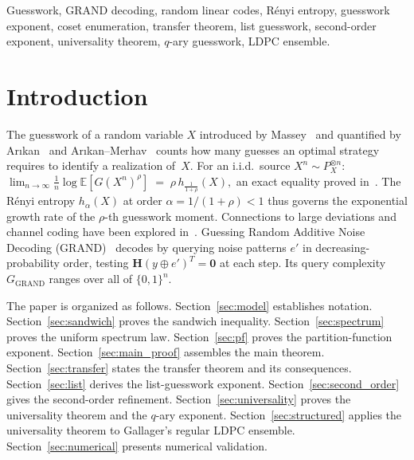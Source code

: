 \documentclass[journal,10pt,onecolumn]{IEEEtran}
\newcommand{\Eb}{\mathbb{E}}
\newcommand{\Hm}{\mathbf{H}}
\begin{document}
\begin{IEEEkeywords}
Guesswork, GRAND decoding, random linear codes,
R\'{e}nyi entropy, guesswork exponent, coset enumeration,
transfer theorem, list guesswork, second-order exponent,
universality theorem, $q$-ary guesswork, LDPC ensemble.
\end{IEEEkeywords}

\section{Introduction}
\label{sec:intro}

The guesswork of a random variable $X$ introduced by
Massey~\cite{massey1994guessing} and quantified by
Ar{\i}kan~\cite{arikan1996inequality} and
Ar{\i}kan--Merhav~\cite{arikan1998guessing}
counts how many guesses an optimal strategy requires to identify
a realization of~$X$.
For an i.i.d.\ source $X^n\sim P_X^{\otimes n}$:
\(
    \lim_{n\to\infty}\frac{1}{n}\log\Eb[G(X^n)^\rho]
    \;=\;
    \rho\,h_{\!\frac{1}{1+\rho}}(X),
\)
an exact equality proved in~\cite{arikan1996inequality}.
The R\'{e}nyi entropy $h_\alpha(X)$ at order $\alpha=1/(1+\rho)<1$
thus governs the exponential growth rate of the $\rho$-th guesswork
moment.
Connections to large deviations and channel coding have been explored
in~\cite{christiansen2013guessing,merhav2020guessing}.
Guessing Random Additive Noise Decoding
(GRAND)~\cite{duffy2021GRAND} decodes by querying
noise patterns $e'$ in decreasing-probability order, testing
$\Hm (y\oplus e')^T=\bm{0}$ at each step.
Its query complexity $G_{\mathrm{GRAND}}$ ranges over all of
$\{0,1\}^n$.


The paper is organized as follows.
Section~\ref{sec:model} establishes notation.
Section~\ref{sec:sandwich} proves the sandwich inequality.
Section~\ref{sec:spectrum} proves the uniform spectrum law.
Section~\ref{sec:pf} proves the partition-function exponent.
Section~\ref{sec:main_proof} assembles the main theorem.
Section~\ref{sec:transfer} states the transfer theorem and
its consequences.
Section~\ref{sec:list} derives the list-guesswork exponent.
Section~\ref{sec:second_order} gives the second-order refinement.
Section~\ref{sec:universality} proves the
universality theorem and the $q$-ary exponent.
Section~\ref{sec:structured} applies the universality theorem to
Gallager's regular LDPC ensemble.
Section~\ref{sec:numerical} presents numerical validation.
\end{document}
